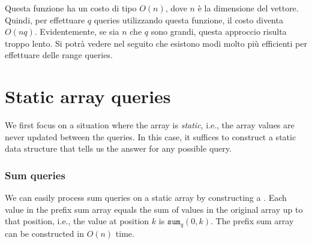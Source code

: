 Questa funzione ha un costo di tipo $O(n)$,
dove $n$ è la dimensione del vettore.
Quindi, per effettuare $q$ queries utilizzando questa funzione, 
il costo diventa $O(nq)$.
Evidentemente, se sia $n$ che $q$ sono grandi, questa approccio
risulta troppo lento.
Si potrà vedere nel seguito che esistono
modi molto più efficienti per effettuare
delle range queries.

\section{Static array queries}

We first focus on a situation where
the array is \emph{static}, i.e.,
the array values are never updated between the queries.
In this case, it suffices to construct
a static data structure that tells us
the answer for any possible query.

\subsubsection{Sum queries}


We can easily process
sum queries on a static array
by constructing a .
Each value in the prefix sum array equals
the sum of values in the original array up to that position,
i.e., the value at position $k$ is $\texttt{sum}_q(0,k)$.
The prefix sum array can be constructed in $O(n)$ time.


